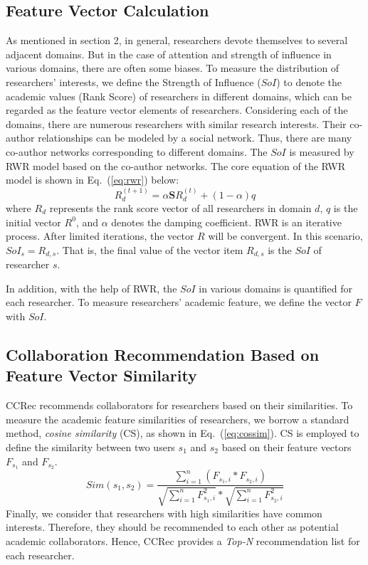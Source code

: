 \documentclass[10pt,letterpaper]{article}
\begin{document}
\subsection*{Feature Vector Calculation}
As mentioned in section 2, in general, researchers devote themselves to several adjacent domains. But in the case of attention and strength of influence in various domains, there are often some biases. To measure the distribution of researchers' interests, we define the Strength of Influence ($SoI$) to denote the academic values (Rank Score) of researchers in different domains, which can be regarded as the feature vector elements of researchers. Considering each of the domains, there are numerous researchers with similar research interests. Their co-author relationships can be modeled by a social network. Thus, there are many co-author networks corresponding to different domains. The $SoI$ is measured by RWR model based on the co-author networks. The core equation of the RWR model is shown in Eq.~(\ref{eq:rwr}) below:
\begin{equation}\label{eq:rwr}
R_{d}^{(t+1)}=\alpha \mathbf{S}R_{d}^{(t)}+(1-\alpha)q
\end{equation}
where $R_{d}$ represents the rank score vector of all researchers in domain $d$, $q$ is the initial vector $R^0$, and $\alpha$ denotes the damping coefficient. RWR is an iterative process. After limited iterations, the vector $R$ will be convergent. In this scenario, $SoI_{s}=R_{d,s}$. That is, the final value of the vector item $R_{d,s}$ is the $SoI$ of researcher $s$.

In addition, with the help of RWR, the $SoI$ in various domains is quantified for each researcher. To measure researchers' academic feature, we define the vector $F$ with $SoI$.


\subsection*{Collaboration Recommendation Based on Feature Vector Similarity}
CCRec recommends collaborators for researchers based on their similarities. To measure the academic feature similarities of researchers, we borrow a standard method, \emph{cosine similarity} (CS), as shown in Eq.~(\ref{eq:cossim}). CS is employed to define the similarity between two users $s_{1}$ and $s_{2}$ based on their feature vectors $F_{s_{1}}$ and $F_{s_{2}}$.
\begin{equation}\label{eq:cossim}
Sim(s_{1},s_{2})=\frac{\sum_{i=1}^{n}(F_{s_{1},i}*F_{s_{2},i})}{\sqrt{\sum_{i=1}^{n}F_{s_{1},i}^2}*\sqrt{\sum_{i=1}^{n}F_{s_{2},i}^2}}
\end{equation}
Finally, we consider that researchers with high similarities have common interests. Therefore, they should be recommended to each other as potential academic collaborators. Hence, CCRec provides a \emph{Top-N} recommendation list for each researcher.
\end{document}
